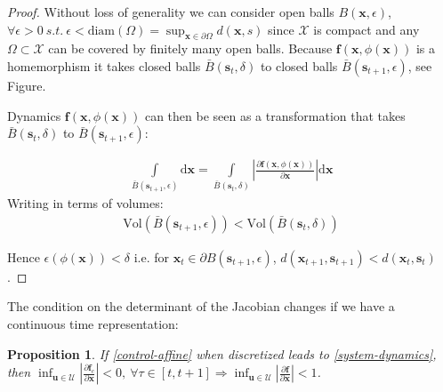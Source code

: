 \documentclass[10pt,a4paper]{article}
\newcommand{\state}{\mathbf{x}} %
\newcommand{\traj}{\mathbf{s}} %
\newcommand{\sysInput}{\mathbf{u}} %
\newtheorem{prop}{Proposition}[section]
\begin{document}
\begin{proof}
Without loss of generality we can consider open balls $B(\state, \epsilon)$, $\forall \epsilon > 0 \ s.t. \ \epsilon < \text{diam}(\Omega) = \sup_{\state \in \partial\Omega} d(\state,s)$ since $\mathcal{X}$ is compact and any $\Omega \subset \mathcal{X}$ can be covered by finitely many open balls. Because $\mathbf{f}(\state, \phi(\state))$ is a homemorphism it takes closed balls $\bar{B}(\traj_{t}, \delta)$ to closed balls $\bar{B}(\traj_{t+1}, \epsilon)$, see Figure.

Dynamics $\mathbf{f}(\state, \phi(\state))$ can then be seen as a transformation that takes $\bar{B}(\traj_t,\delta)$ to $\bar{B}(\traj_{t+1}, \epsilon)$:

\begin{align}
\int\limits_{\bar{B}(\traj_{t+1},\epsilon)}\! \mathrm{d}\state = \int\limits_{\bar{B}(\traj_t,\delta)}\! \left\vert\frac{\partial \mathbf{f}(\state,\phi(\state))}{\partial \state}\right\vert\mathrm{d}\state
\end{align}
Writing in terms of volumes:
\begin{align}
\text{Vol}(\bar{B}(\traj_{t+1},\epsilon)) < \text{Vol}(\bar{B}(\traj_t,\delta))
\end{align}

Hence $\epsilon(\phi(\state)) < \delta$ i.e. for $\state_{t} \in \partial B(\traj_{t+1},\epsilon)$, $d(\state_{t+1}, \traj_{t+1}) < d(\state_{t}, \traj_{t})$.
\end{proof}

The condition on the determinant of the Jacobian changes if we have a continuous time representation:
\begin{prop}
If \eqref{control-affine} when discretized leads to \eqref{system-dynamics}, then $\inf_{\sysInput \in \mathcal{U}} \left\vert\frac{\partial \mathbf{f}_c}{\partial \state}\right\vert < 0, \ \forall \tau \in [t,t+1] \Rightarrow \inf_{\sysInput \in \mathcal{U}} \left\vert\frac{\partial \mathbf{f}}{\partial \state}\right\vert < 1$.
\end{prop}
\end{document}
